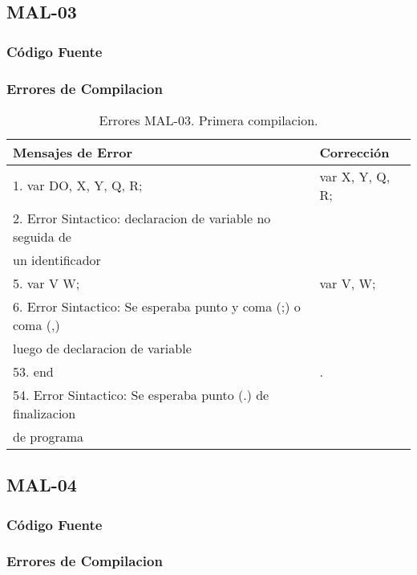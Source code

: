 \documentclass[a4paper,12pt]{article}
\begin{document}
\subsection{MAL-03}
\subsubsection{Código Fuente}

\subsubsection{Errores de Compilacion}

\begin{table}[H]
\centering
\begin{tabular}{|l|l|}
\hline
Mensajes de Error & Corrección\\
\hline
1. var DO, X, Y, Q, R;										& var X, Y, Q, R;\\
2. Error Sintactico: declaracion de variable no seguida de 	&\\
un identificador												&\\
\hline
5. var V W;													& var V, W;\\
6. Error Sintactico: Se esperaba punto y coma (;) o coma (,) &\\
luego de declaracion de variable								&\\
\hline
53. end														& .\\
54. Error Sintactico: Se esperaba punto (.) de finalizacion 	&\\
de programa													&\\
\hline
\end{tabular}
\caption{Errores MAL-03. Primera compilacion.}
\label{MAL-03-1}
\end{table}

\subsection{MAL-04}
\subsubsection{Código Fuente}

\subsubsection{Errores de Compilacion}
\end{document}
